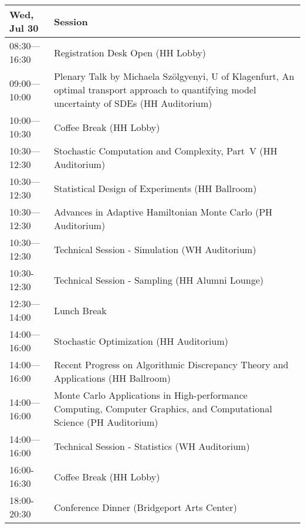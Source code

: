 \begin{table}
{\footnotesize
\begin{tabularx}{\textwidth}{>{\hsize=0.32\hsize}X|>{\hsize=1.7\hsize}X}
\hline
\textbf{Wed, Jul 30} & \textbf{Session} \\
\hline
\cellcolor{\EmptyColor}08:30---16:30 & \cellcolor{\EmptyColor}Registration Desk Open (HH Lobby) \\
\cellcolor{\PlenaryColor}09:00---10:00 & \cellcolor{\PlenaryColor}Plenary Talk by Michaela Sz\"olgyenyi, U of Klagenfurt, An optimal transport approach to quantifying model uncertainty of SDEs (HH Auditorium) \\
\cellcolor{\EmptyColor}10:00---10:30 & \cellcolor{\EmptyColor}Coffee Break (HH Lobby) \\
\cellcolor{\SessionTitleColor}10:30---12:30 & \cellcolor{\SessionTitleColor}Stochastic Computation and Complexity, Part~V (HH Auditorium) \\
\cellcolor{\SessionTitleColor}10:30---12:30 & \cellcolor{\SessionTitleColor}Statistical Design of Experiments (HH Ballroom) \\
\cellcolor{\SessionTitleColor}10:30---12:30 & \cellcolor{\SessionTitleColor}Advances in Adaptive Hamiltonian Monte Carlo (PH Auditorium) \\
\cellcolor{\SessionLightColor}10:30---12:30 & \cellcolor{\SessionLightColor}Technical Session - Simulation (WH Auditorium) \\
\cellcolor{\SessionLightColor}10:30-12:30 & \cellcolor{\SessionLightColor}Technical Session - Sampling (HH Alumni Lounge) \\
\cellcolor{\EmptyColor}12:30---14:00 & \cellcolor{\EmptyColor}Lunch Break \\
\cellcolor{\SessionTitleColor}14:00---16:00 & \cellcolor{\SessionTitleColor}Stochastic Optimization (HH Auditorium) \\
\cellcolor{\SessionTitleColor}14:00---16:00 & \cellcolor{\SessionTitleColor}Recent Progress on Algorithmic Discrepancy Theory and Applications (HH Ballroom) \\
\cellcolor{\SessionTitleColor}14:00---16:00 & \cellcolor{\SessionTitleColor}Monte Carlo Applications in High-performance Computing, Computer Graphics, and Computational Science (PH Auditorium) \\
\cellcolor{\SessionLightColor}14:00---16:00 & \cellcolor{\SessionLightColor}Technical Session - Statistics (WH Auditorium) \\
\cellcolor{\EmptyColor}16:00-16:30 & \cellcolor{\EmptyColor}Coffee Break (HH Lobby) \\
\cellcolor{\EmptyColor}18:00-20:30 & \cellcolor{\EmptyColor}Conference Dinner (Bridgeport Arts Center) \\
\hline
\end{tabularx}
}
\end{table}

